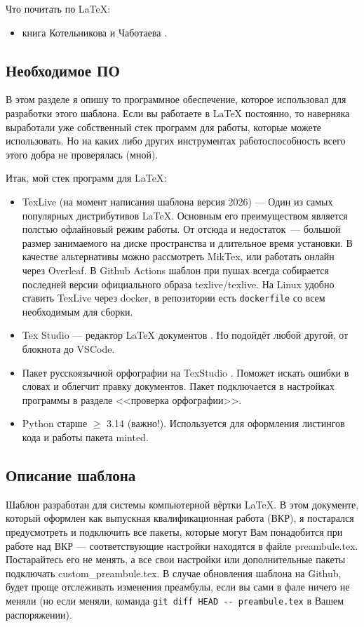 Что почитать по \LaTeX{}:
\begin{itemize}
	\item книга Котельникова и Чаботаева \cite{Kolelnikov:latex}.
\end{itemize}

\subsection{Необходимое ПО}

В этом разделе я опишу то программное обеспечение, которое  использовал для разработки этого шаблона. Если вы работаете в \LaTeX{} постоянно, то наверняка выработали уже собственный стек программ для работы, которые можете использовать. Но на каких либо других инструментах работоспособность всего этого добра не проверялась (мной). 

Итак, мой стек программ для \LaTeX{}:
\begin{itemize}
	\item TexLive (на момент написания шаблона версия 2026) --- Один из самых популярных дистрибутивов \LaTeX{}\cite{cite:texlive}. Основным его преимуществом является полстью офлайновый режим работы. От отсюда и недостаток~--- большой размер занимаемого на диске пространства и длительное время установки. В качестве альтернативы можно рассмотреть MikTex\cite{cite:miktex}, или работать онлайн через Overleaf\cite{cite:ovefleaf}. В Github Actions шаблон при пушах всегда собирается  последней версии официального образа texlive/texlive. На Linux удобно ставить TexLive через docker, в репозитории есть \Verb|dockerfile| со всем необходимым для сборки.
	\item Tex Studio --- редактор \LaTeX{} документов \cite{cite:texstudio}. Но подойдёт любой другой, от блокнота до VSCode.
	\item Пакет русскоязычной орфографии на TexStudio \cite{cite:dict}. Поможет искать ошибки в словах и облегчит правку документов. Пакет подключается в настройках программы в разделе <<проверка орфографии>>.
	\item Python старше $\geq$ 3.14 (важно!). Используется для оформления листингов кода и работы пакета minted. 
\end{itemize}

\subsection{Описание шаблона}

Шаблон разработан для системы компьютерной вёртки \LaTeX{}. В этом документе, который оформлен как выпускная квалификационная работа (ВКР), я постарался предусмотреть и подключить все пакеты, которые могут Вам понадобится при работе над ВКР --- соответствующие настройки находятся в файле preambule.tex. Постарайтесь его не менять, а все свои настройки или дополнительные пакеты подключать custom\_preambule.tex. В случае обновления шаблона на Github, будет проще отслеживать изменения преамбулы, если вы сами в фале ничего не меняли (но если меняли, команда \Verb|git diff HEAD -- preambule.tex| в Вашем распоряжении).

